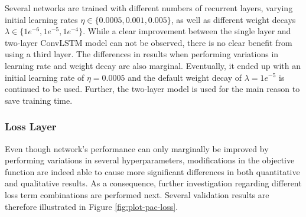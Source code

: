 Several networks are trained with different numbers of recurrent layers, varying initial learning rates $\eta \in \{0.0005, 0.001, 0.005\}$, as well as different weight decays $\lambda \in \{1e^{-6}, 1e^{-5}, 1e^{-4}\} $. While a clear improvement between the single layer and two-layer ConvLSTM model can not be observed, there is no clear benefit from using a third layer. The differences in results when performing variations in learning rate and weight decay are also marginal. Eventually, it ended up with an initial learning rate of $\eta = 0.0005 $ and the default weight decay of $\lambda = 1e^{-5}$ is continued to be used. Further, the two-layer model is used for the main reason to save training time.


\subsubsection*{Loss Layer}

Even though network's performance can only marginally be improved by performing variations in several hyperparameters, modifications in the objective function are indeed able to cause more significant differences in both quantitative and qualitative results. As a consequence, further investigation regarding different loss term combinations are performed next. Several validation results are therefore illustrated in Figure \ref{fig:plot-pac-loss}. 

